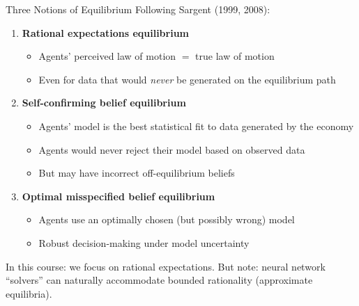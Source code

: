 \documentclass[aspectratio=169,11pt]{beamer}
\newcommand{\emphc}[1]{\textcolor{harvardcrimson}{#1}}
\begin{document}
\begin{frame}{Three Notions of Equilibrium}
\small
{\small Following Sargent (1999, 2008):}

\vspace{0.2em}
\begin{enumerate}\itemsep3pt
    \item \textbf{Rational expectations equilibrium}
    \begin{itemize}
        \item Agents' perceived law of motion $=$ true law of motion
        \item Even for data that would \emph{never} be generated on the equilibrium path
    \end{itemize}

    \item \textbf{Self-confirming belief equilibrium}
    \begin{itemize}
        \item Agents' model is the best statistical fit to data generated by the economy
        \item Agents would never reject their model based on observed data
        \item But may have incorrect off-equilibrium beliefs
    \end{itemize}

    \item \textbf{Optimal misspecified belief equilibrium}
    \begin{itemize}
        \item Agents use an optimally chosen (but possibly wrong) model
        \item Robust decision-making under model uncertainty
    \end{itemize}
\end{enumerate}

\vspace{0.3em}
{\small In this course: we focus on \emphc{rational expectations}. But note: neural network ``solvers'' can naturally accommodate bounded rationality (approximate equilibria).}
\end{frame}
\end{document}
